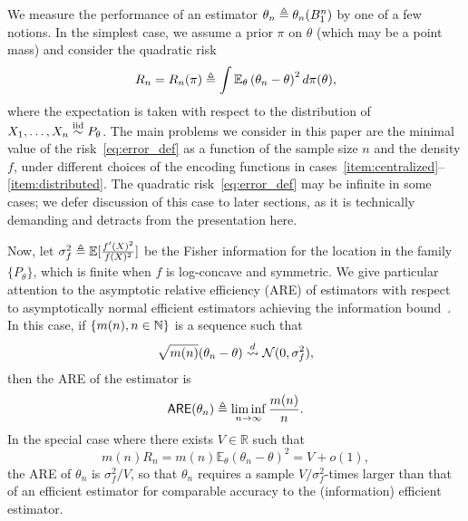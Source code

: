 We measure the performance of an estimator $\theta_n \triangleq
\theta_n(B_1^n)$ by one of a few notions. In the simplest case,
we assume a prior $\pi$ on $\theta$ (which may be a point
mass) and consider the quadratic risk
\begin{equation}
  \label{eq:error_def}
  R_n = R_n(\pi) \triangleq \int \mathbb{E}_\theta\left({\theta}_n - \theta \right)^2
  d\pi(\theta),
\end{equation}
where the expectation is taken with respect to the distribution of
$X_1,\ldots,X_n \stackrel{\textup{iid}}{\sim} P_\theta$.  The main problems we consider in this
paper are the minimal value of the risk~\eqref{eq:error_def} as a function
of the sample size $n$ and the density $f$, under different choices of the
encoding functions in
cases~\eqref{item:centralized}--\eqref{item:distributed}.
The quadratic risk~\eqref{eq:error_def} may be infinite in some cases;
we defer discussion of this case to later sections, as it is technically
demanding and detracts from the presentation here.

Now, let $\sigma_f^2 \triangleq \mathbb{E}[\frac{f'(X)^2}{f(X)^2}]$ be the Fisher
information for the location in the family $\{P_\theta\}$, which is finite
when $f$ is log-concave and symmetric. We give particular attention to the
asymptotic relative efficiency (ARE) of estimators with respect to
asymptotically normal efficient estimators achieving the information
bound~\cite{VanDerVaart98}. In this case,
if $\{m(n), n \in \mathbb{N}\}$ is a sequence such that
\begin{equation*}
  \sqrt{m(n)} (\theta_n - \theta) \stackrel{d}{\rightsquigarrow} \mathcal{N}(0, \sigma_f^2),
\end{equation*}
then the ARE of the estimator is~\cite[Def.~6.6.6]{LehmannCa98}
\begin{equation*}
  \mathsf{ARE}({\theta}_n) \triangleq
  \liminf_{n\rightarrow \infty} \frac{m(n)}{n}.
\end{equation*}
In the special case where there exists $V \in \mathbb R$ such that
\[
m(n) R_n =
m(n) \mathbb E_\theta\left({\theta}_n - \theta \right)^2 = V + o(1),
\]
the ARE of ${\theta}_n$ is $\sigma_f^2/V$, so that $\theta_n$ requires a
sample $V / \sigma_f^2$-times larger than that of an efficient estimator for
comparable accuracy to the (information) efficient estimator.


